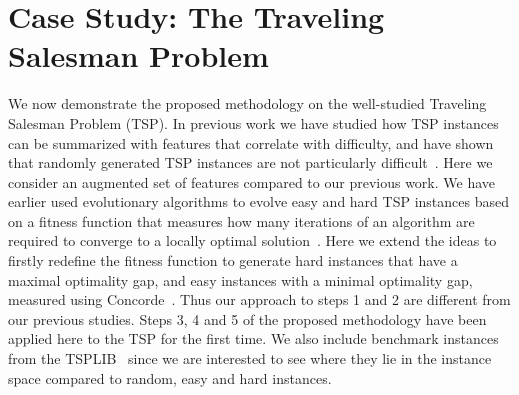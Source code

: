 \documentclass[conference]{IEEEtran}
\begin{document}
\section{Case Study: The Traveling Salesman Problem} \label{sec:TspCaseStudy}
We now demonstrate the proposed methodology on the well-studied Traveling Salesman Problem (TSP). In previous work we have studied how TSP instances can be summarized with features that correlate with difficulty, and have shown that randomly generated TSP instances are not particularly difficult~\cite{AMAI}. Here we consider an augmented set of features compared to our previous work. We have earlier used evolutionary algorithms to evolve easy and hard TSP instances based on a fitness function that measures how many iterations of an algorithm are required to converge to a locally optimal solution~\cite{AMAI}. Here we extend the ideas to firstly redefine the fitness function to generate hard instances that have a maximal optimality gap, and easy instances with a minimal optimality gap, measured using Concorde~\cite{Concorde}. Thus our approach to steps 1 and 2 are different from our previous studies. Steps 3, 4 and 5 of the proposed methodology have been applied here to the TSP for the first time. We also include benchmark instances from the TSPLIB~\cite{TSPLIB, TSPLIB95} since we are interested to see where they lie in the instance space compared to random, easy and hard instances.
\end{document}
